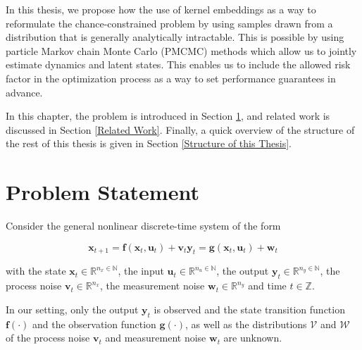 In this thesis, we propose how the use of kernel embeddings \cite{Yassine_22} as a way to reformulate the chance-constrained problem by using samples drawn from a distribution that is generally analytically intractable. This is possible by using particle Markov chain Monte Carlo (PMCMC) methods which allow us to jointly estimate dynamics and latent states. This enables us to include the allowed risk factor in the optimization process as a way to set performance guarantees in advance.

In this chapter, the problem is introduced in Section \ref{Problem Statement}, and related work is discussed in Section \ref{Related Work}. Finally, a quick overview of the structure of the rest of this thesis is given in Section \ref{Structure of this Thesis}.

\section{Problem Statement} \label{Problem Statement}

Consider the general nonlinear discrete-time system of the form

\begin{subequations} \label{System equation}
\begin{equation}
\boldsymbol{x}_{t+1} = \boldsymbol{f} \left( \boldsymbol{x}_{t}, \boldsymbol{u}_t \right) + \boldsymbol{v}_{t}
\end{equation}
\begin{equation}
\boldsymbol{y}_{t} = \boldsymbol{g} \left( \boldsymbol{x}_{t}, \boldsymbol{u}_t \right) + \boldsymbol{w}_{t}
\end{equation}
\end{subequations}

with the state $\boldsymbol{x}_t \in \mathbb{R}^{n_x \in \mathbb{N}}$, the input $\boldsymbol{u}_t \in \mathbb{R}^{n_u \in \mathbb{N}}$, the output $\boldsymbol{y}_t \in \mathbb{R}^{n_y \in \mathbb{N}}$, the process noise $\boldsymbol{v}_{t} \in \mathbb{R}^{n_x}$, the measurement noise $\boldsymbol{w}_{t} \in \mathbb{R}^{n_y}$ and time $t \in \mathbb{Z}$. 

In our setting, only the output $\boldsymbol{y}_t$ is observed and the state transition function $\boldsymbol{f}(\cdot)$ and the observation function $\boldsymbol{g}(\cdot)$, as well as the distributions $\boldsymbol{\mathcal{V}}$ and $\boldsymbol{\mathcal{W}}$ of the process noise $\boldsymbol{v}_t$ and measurement noise $\boldsymbol{w}_t$ are unknown.

